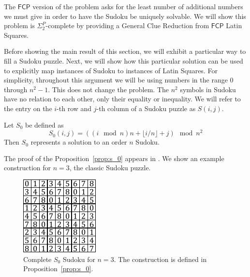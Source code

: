 \documentclass[runningheads,a4paper]{llncs}
\begin{document}
The $\mathsf{FCP}$ version of the problem asks for the least number of additional numbers we must give in order to have the Sudoku be uniquely solvable. We will show this problem is $\Sigma_2^P$-complete by providing a General Clue Reduction from $\mathsf{FCP}$ Latin Squares. 

Before showing the main result of this section, we will exhibit a particular way to fill a Sudoku puzzle. Next, we will show how this particular solution can be used to explicitly map instances of Sudoku to instances of Latin Squares. For simplicity, throughout this argument we will be using numbers in the range $0$ through $n^2 - 1$. This does not change the problem. The $n^2$ symbols in Sudoku have no relation to each other, only their equality or inequality. We will refer to the entry on the $i$-th row and $j$-th column of a Sudoku puzzle as $S(i,j)$.

\begin{proposition}
\label{prop:s_0}
Let $S_0$ be defined as
\[ S_0 (i,j) = ((i \mod n) n + \lfloor i/n \rfloor + j) \mod n^2 \]
Then $S_0$ represents a solution to an order $n$ Sudoku.
\end{proposition}

The proof of the Proposition~\ref{prop:s_0} appears in \cite{takayaki2003complexity}. We show an example construction for $n=3$, the classic Sudoku puzzle.

\begin{figure}
\centering
\label{fig:s_0}
\includegraphics[width=0.6\linewidth]{sudoku_s_0.pdf}
\caption{Complete $S_0$ Sudoku for $n = 3$. The construction is defined in Proposition~\ref{prop:s_0}.}
\end{figure}
\end{document}
